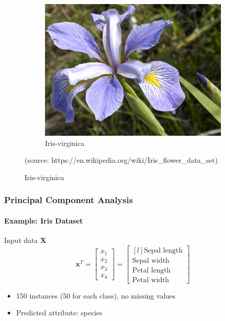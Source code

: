 \documentclass[12pt,a4paper,xcolor=dvipsnames,xcolor=table]{beamer}
\begin{document}
\begin{frame}
\begin{figure}
\begin{subfigure}{0.3\textwidth}
        \end{subfigure}
        \begin{subfigure}{0.3\textwidth}
            \includegraphics[width=\textwidth]{fig/iris_virginica.jpg}\caption{Iris-virginica}
        \end{subfigure} 
        {\color{gray} (source: https://en.wikipedia.org/wiki/Iris\_flower\_data\_set)}
    \end{figure}
\end{frame}

\begin{frame}
\frametitle{Principal Component Analysis}
\framesubtitle{Example: Iris Dataset}

Input data $\mathbf{X}$
\[
    \mathbf{x}^T = \begin{bmatrix}
        x_1\\ x_2\\ x_3 \\x_4
    \end{bmatrix} = \begin{bmatrix*}[l]
        \text{Sepal length}\\ \text{Sepal width}\\ \text{Petal length}\\ \text{Petal width}
    \end{bmatrix*}
\]
\begin{itemize}
    \item 150 instances (50 for each class), no missing values
    \item Predicted attribute: species
\end{itemize}
\end{frame}
\end{document}
